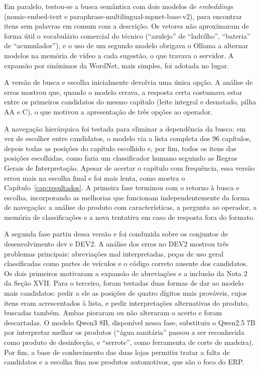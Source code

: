Em paralelo, testou-se a busca semântica com dois modelos de \textit{embeddings} (nomic-embed-text e paraphrase-multilingual-mpnet-base-v2), para encontrar itens sem palavras em comum com a descrição. Os vetores não aproximaram de forma útil o vocabulário comercial do técnico (``azulejo'' de ``ladrilho'', ``bateria'' de ``acumulador''), e o uso de um segundo modelo obrigava o Ollama a alternar modelos na memória de vídeo a cada sugestão, o que travava o servidor. A expansão por sinônimos da WordNet, mais simples, foi adotada no lugar.

A versão de busca e escolha inicialmente devolvia uma única opção. A análise de erros mostrou que, quando o modelo errava, a resposta certa costumava estar entre os primeiros candidatos do mesmo capítulo (leite integral e desnatado, pilha AA e C), o que motivou a apresentação de três opções ao operador.

A navegação hierárquica foi testada para eliminar a dependência da busca: em vez de escolher entre candidatos, o modelo via a lista completa dos 96 capítulos, depois todas as posições do capítulo escolhido e, por fim, todos os itens das posições escolhidas, como faria um classificador humano seguindo as Regras Gerais de Interpretação. Apesar de acertar o capítulo com frequência, essa versão errou mais na escolha final e foi mais lenta, como mostra o Capítulo~\ref{cap:resultados}. A primeira fase terminou com o retorno à busca e escolha, incorporando as melhorias que funcionam independentemente da forma de navegação: a análise do produto com características, a pergunta ao operador, a memória de classificações e a nova tentativa em caso de resposta fora do formato.

A segunda fase partiu dessa versão e foi conduzida sobre os conjuntos de desenvolvimento dev e DEV2. A análise dos erros no DEV2 mostrou três problemas principais: abreviações mal interpretadas, peças de uso geral classificadas como partes de veículos e o código correto ausente dos candidatos. Os dois primeiros motivaram a expansão de abreviações e a inclusão da Nota 2 da Seção XVII. Para o terceiro, foram testadas duas formas de dar ao modelo mais candidatos: pedir a ele as posições de quatro dígitos mais prováveis, cujos itens eram acrescentados à lista, e pedir interpretações alternativas do produto, buscadas também. Ambas pioraram ou não alteraram o acerto e foram descartadas. O modelo Qwen3 8B, disponível nessa fase, substituiu o Qwen2.5 7B por interpretar melhor os produtos (``água sanitária'' passou a ser reconhecida como produto de desinfecção, e ``serrote'', como ferramenta de corte de madeira). Por fim, a base de conhecimento das duas lojas permitiu tratar a falta de candidatos e a escolha fina nos produtos automotivos, que são o foco do ERP.
